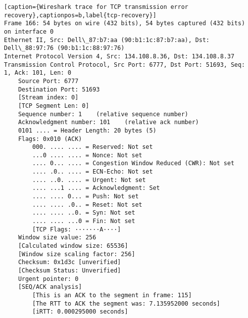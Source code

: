 \begin{lstlisting}[caption={Wireshark trace for TCP transmission error recovery},captionpos=b,label{tcp-recovery}]
Frame 166: 54 bytes on wire (432 bits), 54 bytes captured (432 bits) on interface 0
Ethernet II, Src: Dell\_87:b7:aa (90:b1:1c:87:b7:aa), Dst: Dell\_88:97:76 (90:b1:1c:88:97:76)
Internet Protocol Version 4, Src: 134.108.8.36, Dst: 134.108.8.37
Transmission Control Protocol, Src Port: 6777, Dst Port: 51693, Seq: 1, Ack: 101, Len: 0
	Source Port: 6777
	Destination Port: 51693
	[Stream index: 0]
	[TCP Segment Len: 0]
	Sequence number: 1    (relative sequence number)
	Acknowledgment number: 101    (relative ack number)
	0101 .... = Header Length: 20 bytes (5)
	Flags: 0x010 (ACK)
		000. .... .... = Reserved: Not set
		...0 .... .... = Nonce: Not set
		.... 0... .... = Congestion Window Reduced (CWR): Not set
		.... .0.. .... = ECN-Echo: Not set
		.... ..0. .... = Urgent: Not set
		.... ...1 .... = Acknowledgment: Set
		.... .... 0... = Push: Not set
		.... .... .0.. = Reset: Not set
		.... .... ..0. = Syn: Not set
		.... .... ...0 = Fin: Not set
		[TCP Flags: ·······A····]
	Window size value: 256
	[Calculated window size: 65536]
	[Window size scaling factor: 256]
	Checksum: 0x1d3c [unverified]
	[Checksum Status: Unverified]
	Urgent pointer: 0
	[SEQ/ACK analysis]
		[This is an ACK to the segment in frame: 115]
		[The RTT to ACK the segment was: 7.135952000 seconds]
		[iRTT: 0.000295000 seconds]
\end{lstlisting}

